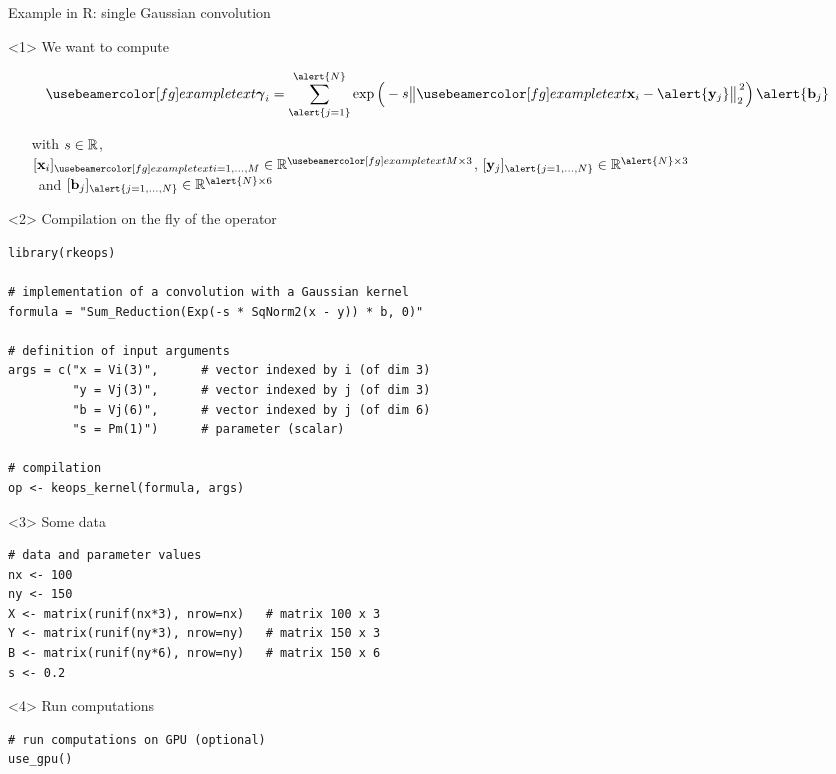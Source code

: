 \documentclass[14pt]{beamer}
\begin{document}
\begin{frame}[fragile]{Example in R: single Gaussian convolution}

\begin{onlyenv}<1>
We want to compute\medskip

\[
\myexample{\mbg\gamma_i} = \sum_{\alert{j=1}}^{\alert{N}}  \exp\Big(-s \Vertt \myexample{\mb x_i} - \alert{\mb y_j}\Vertt_2^{\,2}\Big)\,\alert{\mb b_j}
\]
\bigskip

\begin{itemize}
\item[with] $s\in\mathbb{R}$,\\ $[\mb x_i]_{\myexample{i=1,\hdots,M}} \in\RR^{\myexample{M}\times 3}$, $[\mb y_j]_{\alert{j=1,\hdots,N}} \in\RR^{\alert{N}\times 3}$\\\ and $[\mb b_j]_{\alert{j=1,\hdots,N}} \in\RR^{\alert{N}\times 6}$
\end{itemize}
\end{onlyenv}

\begin{onlyenv}<2>
Compilation on the fly of the operator
\begin{verbatim}
library(rkeops)

# implementation of a convolution with a Gaussian kernel
formula = "Sum_Reduction(Exp(-s * SqNorm2(x - y)) * b, 0)"

# definition of input arguments
args = c("x = Vi(3)",      # vector indexed by i (of dim 3)
         "y = Vj(3)",      # vector indexed by j (of dim 3)
         "b = Vj(6)",      # vector indexed by j (of dim 6)
         "s = Pm(1)")      # parameter (scalar)
         
# compilation
op <- keops_kernel(formula, args)
\end{verbatim}
\end{onlyenv}

\begin{onlyenv}<3>
Some data
\begin{verbatim}
# data and parameter values
nx <- 100
ny <- 150
X <- matrix(runif(nx*3), nrow=nx)   # matrix 100 x 3
Y <- matrix(runif(ny*3), nrow=ny)   # matrix 150 x 3
B <- matrix(runif(ny*6), nrow=ny)   # matrix 150 x 6
s <- 0.2
\end{verbatim}
\end{onlyenv}

\begin{onlyenv}<4>
Run computations
\begin{verbatim}
# run computations on GPU (optional)
use_gpu()



\end{verbatim}
\end{onlyenv}
\end{frame}
\end{document}
